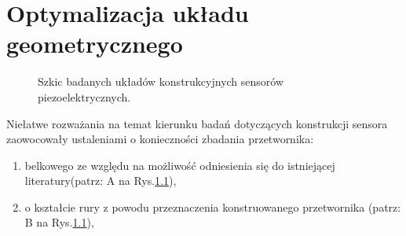 \chapter{Optymalizacja układu geometrycznego}
\label{sec:construction_optymization}
\begin{figure}[htbp]
\centering
{}%
\caption{Szkic badanych układów konstrukcyjnych sensorów piezoelektrycznych.}
\label{fig:construct_scetch}
\end{figure}
Niełatwe rozważania na temat kierunku badań dotyczących konstrukcji sensora zaowocowały ustaleniami o konieczności zbadania przetwornika:
\begin{enumerate}
\item belkowego ze względu na możliwość odniesienia się do istniejącej literatury(patrz: A na Rys.\ref{fig:construct_scetch}),
\item o kształcie rury z powodu przeznaczenia konstruowanego przetwornika (patrz: B na Rys.\ref{fig:construct_scetch}),
\end{enumerate}